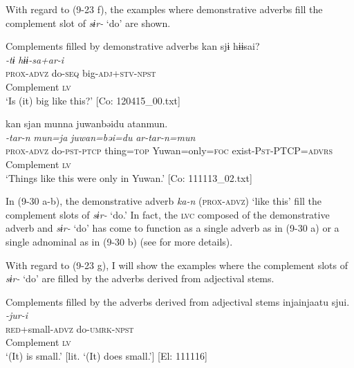 With regard to (9-23 f), the examples where demonstrative adverbs fill the complement slot of \textit{sɨr-} ‘do’ are shown.

\ea   Complements filled by demonstrative adverbs \label{ex:9.30}
\ea %
 \gllll  kan  sjɨ  hɨɨsai?\\
      \textit{}  \textit{-tɨ}  \textit{hɨɨ-sa+ar-i}\\
      \textsc{prox}-\textsc{advz}  do-\textsc{seq}  big-\textsc{adj}+\textsc{stv}-\textsc{npst}\\
      Complement  \textsc{lv}  \\
    \glt       ‘Is (it) big like this?’ [Co: 120415\_00.txt]

  \ex %
  \glll kan  sjan  munna  juwanbəidu   atanmun.\\
      \textit{}  \textit{-tar-n}  \textit{mun=ja}  \textit{juwan=bəi=du} \textit{ar-tar-n=mun}\\
      \textsc{prox}-\textsc{advz}  do-\textsc{pst}-\textsc{ptcp}  thing=\textsc{top}  Yuwan=only=\textsc{foc} exist-P\textsc{st}-PTCP=\textsc{advrs}\\
      Complement  \textsc{lv}\\
      \glt ‘Things like this were only in Yuwan.’   [Co: 111113\_02.txt]
    \z
\z

In (9-30 a-b), the demonstrative adverb \textit{ka-n} (\textsc{prox}-\textsc{advz}) ‘like this’ fill the complement slots of \textit{sɨr-} ‘do.’ In fact, the \textsc{lvc} composed of the demonstrative adverb and \textit{sɨr-} ‘do’ has come to function as a single adverb as in (9-30 a) or a single adnominal as in (9-30 b) (see  for more details).

With regard to (9-23 g), I will show the examples where the complement slots of \textit{sɨr-} ‘do’ are filled by the adverbs derived from adjectival stems.

\ea   Complements filled by the adverbs derived from adjectival stems \label{ex:9.31}
\ea %
 \gllll  injainjaatu  sjui.\\
      \textit{}  \textit{-jur-i}\\
      \textsc{red}+small-\textsc{advz}  do-\textsc{umrk}-\textsc{npst}\\
      Complement  \textsc{lv}\\
      \glt       ‘(It) is small.’ [lit. ‘(It) does small.’] [El: 111116]

